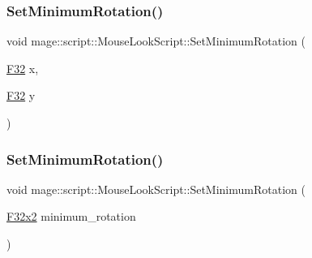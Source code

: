 \hypertarget{classmage_1_1script_1_1_mouse_look_script_a6964af9c1c264be02c37671019ab117f}{}\label{classmage_1_1script_1_1_mouse_look_script_a6964af9c1c264be02c37671019ab117f} 
\subsubsection{\texorpdfstring{Set\+Minimum\+Rotation()}{SetMinimumRotation()}\hspace{0.1cm}{\footnotesize\ttfamily [1/3]}}
{\footnotesize\ttfamily void mage\+::script\+::\+Mouse\+Look\+Script\+::\+Set\+Minimum\+Rotation (\begin{DoxyParamCaption}\item[{\hyperlink{namespacemage_aa97e833b45f06d60a0a9c4fc22ae02c0}{F32}}]{x,  }\item[{\hyperlink{namespacemage_aa97e833b45f06d60a0a9c4fc22ae02c0}{F32}}]{y }\end{DoxyParamCaption})\hspace{0.3cm}{\ttfamily [noexcept]}}

\hypertarget{classmage_1_1script_1_1_mouse_look_script_ab901aa0a3d22ef1e28f00db6f4f99aa1}{}\label{classmage_1_1script_1_1_mouse_look_script_ab901aa0a3d22ef1e28f00db6f4f99aa1} 
\subsubsection{\texorpdfstring{Set\+Minimum\+Rotation()}{SetMinimumRotation()}\hspace{0.1cm}{\footnotesize\ttfamily [2/3]}}
{\footnotesize\ttfamily void mage\+::script\+::\+Mouse\+Look\+Script\+::\+Set\+Minimum\+Rotation (\begin{DoxyParamCaption}\item[{\hyperlink{namespacemage_aa87237ad091f5cd7da612b8523fc108f}{F32x2}}]{minimum\+\_\+rotation }\end{DoxyParamCaption})\hspace{0.3cm}{\ttfamily [noexcept]}}

